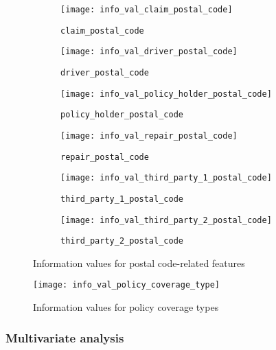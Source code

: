 \documentclass[12pt]{article}
\begin{document}
\clearpage
\begin{figure}[h]
\centering
\begin{subfigure}{.5\textwidth}
  \centering
  \texttt{[image: info\_val\_claim\_postal\_code]}
  \caption{\texttt{claim\_postal\_code}}
  \label{fig:sub1}
\end{subfigure}%
\begin{subfigure}{.5\textwidth}
  \centering
  \texttt{[image: info\_val\_driver\_postal\_code]}
  \caption{\texttt{driver\_postal\_code}}
  \label{fig:sub2}
\end{subfigure}
\vspace{0.5cm}

\begin{subfigure}{.5\textwidth}
  \centering
  \texttt{[image: info\_val\_policy\_holder\_postal\_code]}
  \caption{\texttt{policy\_holder\_postal\_code}}
  \label{fig:sub3}
\end{subfigure}%
\begin{subfigure}{.5\textwidth}
  \centering
  \texttt{[image: info\_val\_repair\_postal\_code]}
  \caption{\texttt{repair\_postal\_code}}
  \label{fig:sub4}
\end{subfigure}
\vspace{0.5cm}

\begin{subfigure}{.5\textwidth}
  \centering
  \texttt{[image: info\_val\_third\_party\_1\_postal\_code]}
  \caption{\texttt{third\_party\_1\_postal\_code}}
  \label{fig:sub5}
\end{subfigure}%
\begin{subfigure}{.5\textwidth}
  \centering
  \texttt{[image: info\_val\_third\_party\_2\_postal\_code]}
  \caption{\texttt{third\_party\_2\_postal\_code}}
  \label{fig:sub6}
\end{subfigure}
\caption{Information values for postal code-related features}
\label{fig:iv_postal_code}
\end{figure}

\clearpage

\begin{figure}[h]
\centering
\texttt{[image: info\_val\_policy\_coverage\_type]}
\caption{Information values for policy coverage types}
\end{figure}


\subsubsection*{Multivariate analysis}
\end{document}
